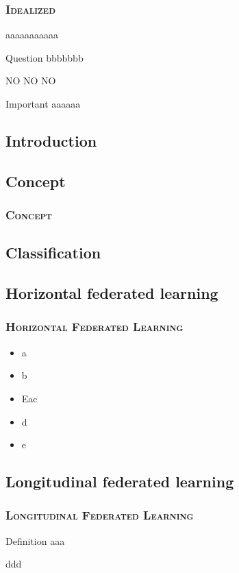 \documentclass[11pt]{beamer}
\begin{document}
\begin{frame}
	\frametitle{\textsc{Idealized}}
	aaaaaaaaaaa
	\begin{block}{Question}
		bbbbbbb
	\end{block}
	NO NO NO
	\begin{alertblock}{Important}
		aaaaaa
	\end{alertblock}
		 
\end{frame}

\begin{frame}
	\section{Introduction}
	\subsection{Concept}
	\frametitle{\textsc{Concept}}
\end{frame}

\begin{frame}
	\section{Classification}
	\subsection{Horizontal federated learning}
	\frametitle{\textsc{Horizontal Federated Learning}}
	\begin{itemize}
		\item a
		\item b
		\item Eac
		\item d
		\item e
	\end{itemize}
\end{frame}

\begin{frame}
	\subsection{Longitudinal federated learning}
	\frametitle{\textsc{Longitudinal Federated Learning}}
	\begin{block}{Definition}
		aaa
	\end{block}
	\begin{example}
		ddd
	\end{example}
\end{frame}
\end{document}
